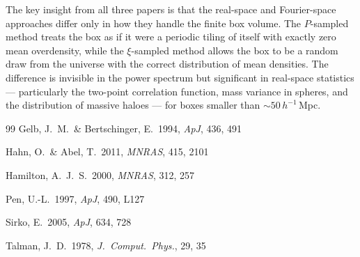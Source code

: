 \documentclass[12pt]{article}
\begin{document}
The key insight from all three papers is that the real-space and
Fourier-space approaches differ only in how they handle the finite box
volume.  The $P$-sampled method treats the box as if it were a periodic
tiling of itself with exactly zero mean overdensity, while the
$\xi$-sampled method allows the box to be a random draw from the
universe with the correct distribution of mean densities.  The difference
is invisible in the power spectrum but significant in real-space
statistics --- particularly the two-point correlation function, mass
variance in spheres, and the distribution of massive haloes --- for
boxes smaller than $\sim 50\,h^{-1}$\,Mpc.

\bigskip
\begin{thebibliography}{99}
Gelb, J.~M.\ \& Bertschinger, E.\ 1994, \textit{ApJ}, 436, 491

Hahn, O.\ \& Abel, T.\ 2011, \textit{MNRAS}, 415, 2101

Hamilton, A.~J.~S.\ 2000, \textit{MNRAS}, 312, 257

Pen, U.-L.\ 1997, \textit{ApJ}, 490, L127

Sirko, E.\ 2005, \textit{ApJ}, 634, 728

Talman, J.~D.\ 1978, \textit{J.\ Comput.\ Phys.}, 29, 35
\end{thebibliography}
\end{document}
